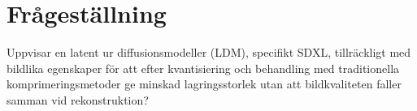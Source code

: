 

\section*{Frågeställning}
    \enlargethispage{\baselineskip}

Uppvisar en latent ur diffusionsmodeller (LDM), specifikt SDXL, tillräckligt med bildlika egenskaper för att efter kvantisiering och behandling med traditionella komprimeringsmetoder ge minskad lagringsstorlek utan att bildkvaliteten faller samman vid rekonstruktion? %



